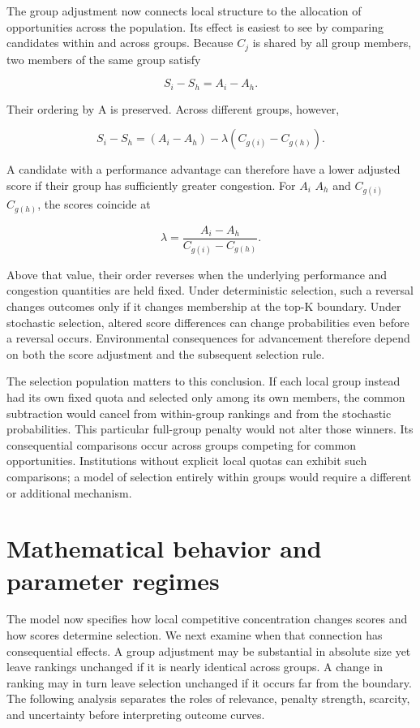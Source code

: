 The group adjustment now connects local structure to the allocation of opportunities across the population. Its effect is easiest to see by comparing candidates within and across groups. Because \(C_{j}\) is shared by all group members, two members of the same group satisfy

\[
S_{i} - S_{h} = A_{i} - A_{h}.
\]

Their ordering by A is preserved. Across different groups, however,

\[
S_{i} - S_{h} = (A_{i} - A_{h}) - \lambda(C_{g(i)} - C_{g(h)}).
\]

A candidate with a performance advantage can therefore have a lower adjusted score if their group has sufficiently greater congestion. For \(A_{i}\) \(A_{h}\) and \(C_{g(i)}\) \(C_{g(h)}\), the scores coincide at

\[
\lambda = \frac{A_{i} - A_{h}}{C_{g(i)} - C_{g(h)}}.
\]

Above that value, their order reverses when the underlying performance and congestion quantities are held fixed. Under deterministic selection, such a reversal changes outcomes only if it changes membership at the top-K boundary. Under stochastic selection, altered score differences can change probabilities even before a reversal occurs. Environmental consequences for advancement therefore depend on both the score adjustment and the subsequent selection rule.

The selection population matters to this conclusion. If each local group instead had its own fixed quota and selected only among its own members, the common subtraction would cancel from within-group rankings and from the stochastic probabilities. This particular full-group penalty would not alter those winners. Its consequential comparisons occur across groups competing for common opportunities. Institutions without explicit local quotas can exhibit such comparisons; a model of selection entirely within groups would require a different or additional mechanism.

\section{Mathematical behavior and parameter regimes}\label{mathematical-behavior-and-parameter-regimes}

The model now specifies how local competitive concentration changes scores and how scores determine selection. We next examine when that connection has consequential effects. A group adjustment may be substantial in absolute size yet leave rankings unchanged if it is nearly identical across groups. A change in ranking may in turn leave selection unchanged if it occurs far from the boundary. The following analysis separates the roles of relevance, penalty strength, scarcity, and uncertainty before interpreting outcome curves.

